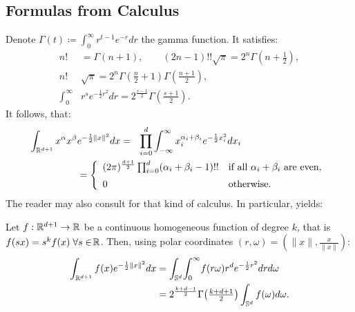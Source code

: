 \subsection{Formulas from Calculus}
Denote $\Gamma(t) \coloneqq \int_{0}^{\infty}r^{t-1}e^{-r}dr$ the gamma function. It satisfies:
\begin{align}
\label{ffgamma}
n!&=\Gamma(n+1),\qquad (2n-1)!!\sqrt{\pi} =2^{n}\Gamma\left(n+\tfrac{1}{2}\right), \\
\label{doublegamma}
n!&\sqrt{\pi}=2^{n}\Gamma\left(\tfrac{n}{2}+1\right)\Gamma\left(\tfrac{n+1}{2}\right) ,\\
\int_0^\infty& r^se^{-\frac{1}{2}r^2} dr = 2^{\frac{s-1}{2}}\Gamma\left(\tfrac{s+1}{2}\right).
\end{align}
It follows, that:
\begin{align}    \label{monoint}
 \int_{\R^{d+1}}x^\alpha x^\beta & e^{-\frac{1}{2}\|x\|^2} dx = \ \ 
\displaystyle \prod_{i=0}^d \int_{-\infty}^\infty x_i^{\alpha_i+\beta_i} e^{-\frac{1}{2}x_i^2} dx_i \\
 &= \left\{
\begin{array}{*2{l}p{5cm}}
(2 \pi)^{\frac{d+1}{2}}\prod_{i=0}^d (\alpha_i+\beta_i-1)!! &\text{if all }\alpha_i+\beta_i\text{ are even}, \vspace{0.2cm} \\ 
 0 &\text{otherwise}.
\end{array}
  \right.\nonumber
\end{align}
The reader may also consult \cite{Folland} for that kind of calculus. In particular, \cite[Eq.~(4)]{Folland} yields:
\begin{lemma}\label{homosphere}
Let $f:\mathbb{R}^{d+1}\rightarrow\mathbb{R}$ be a continuous homogeneous function of degree $k$, that is $f(sx) = s^kf(x)\; \forall s\in\!\mathbb{R}$. Then, using polar coordinates $(r,\omega) = (\|x\|,\frac{x}{\|x\|})$:
\begin{align*}
\int_{\mathbb{R}^{d+1}}f(x)e^{-\frac{1}{2}\|x\|^2} dx &= \int_{\mathbb{S}^d}\!\int_0^\infty\! f(r\omega) r^d e^{-\frac{1}{2}r^2}dr d\omega \\
&= 2^{\frac{k+d-1}{2}}\Gamma\!\left(\tfrac{k+d+1}{2}\right)\int_{\mathbb{S}^d}f(\omega)d\omega .
\end{align*}
\end{lemma}


